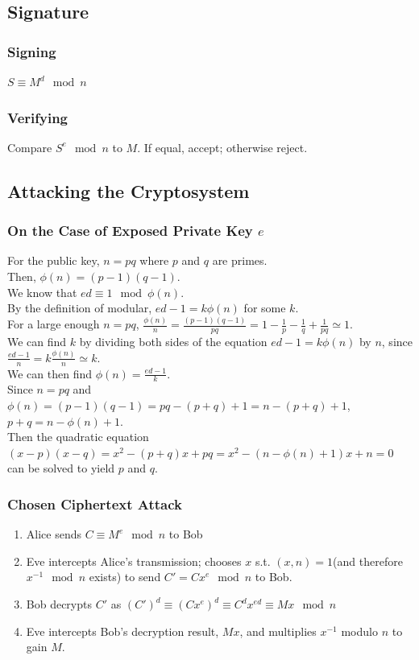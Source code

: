 \documentclass{report}
\begin{document}
		\subsection{Signature}
			\subsubsection{Signing}
			$S \equiv M^d \mod n$
			
			\subsubsection{Verifying}
			Compare $S^e \mod n$ to $M$. If equal, accept; otherwise reject.
		
		\subsection{Attacking the Cryptosystem}
			\subsubsection{On the Case of Exposed Private Key $e$}
			For the public key, $n=pq$ where $p$ and $q$ are primes.\\
			Then, $\phi(n)=(p-1)(q-1)$.\\
			We know that $ed \equiv 1 \mod \phi(n)$.\\
			By the definition of modular, $ed-1=k \phi(n)$ for some $k$.\\
			For a large enough $n=pq$, $\frac{\phi(n)}{n} = \frac{(p-1)(q-1)}{pq} = 1 - \frac{1}{p} - \frac{1}{q} +\frac{1}{pq}  \simeq 1$.\\
			We can find $k$ by dividing both sides of the equation $ed-1=k \phi(n)$ by $n$, since $\frac{ed-1}{n}=k\frac{\phi(n)}{n} \simeq k$.\\
			We can then find $\phi(n)=\frac{ed-1}{k}$.\\
			Since $n=pq$ and $\phi(n)=(p-1)(q-1)=pq-(p+q)+1=n-(p+q)+1$, $p+q=n-\phi(n)+1$.\\
			Then the quadratic equation $(x-p)(x-q)=x^2-(p+q)x+pq=x^2-(n-\phi(n)+1)x+n=0$ can be solved to yield $p$ and $q$.
			
			\subsubsection{Chosen Ciphertext Attack}
			\begin{enumerate}
				\item Alice sends $C\equiv M^e \mod n$ to Bob
				\item Eve intercepts Alice's transmission; chooses $x$ s.t. $(x,n)=1$(and therefore $x^{-1} \mod n$ exists) to send $C'=Cx^e \mod n$ to Bob.
				\item Bob decrypts $C'$ as $(C')^d \equiv (Cx^e)^d \equiv C^d x^{ed} \equiv Mx \mod n$
				\item Eve intercepts Bob's decryption result, $Mx$, and multiplies $x^{-1}$ modulo $n$ to gain $M$.
			\end{enumerate}
			
\end{document}
